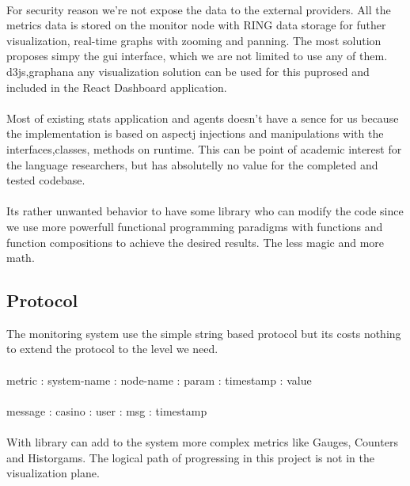 \paragraph{}
For security reason we're not expose the data to the external providers.
All the metrics data is stored on the monitor node with RING data storage for futher visualization, real-time graphs with zooming and panning.
The most solution proposes simpy the gui interface, which we are not limited to use any of them.
d3js,graphana any visualization solution can be used for this puprosed and included in the React Dashboard application.

\paragraph{}
Most of existing stats application and agents doesn't have a sence for us because the implementation is based on aspectj injections and manipulations with the interfaces,classes, methods on runtime.
This can be point of academic interest for the language researchers, but has absolutelly no value for the completed and tested codebase.

\paragraph{}
Its rather unwanted behavior to have some library who can modify the code since we use more powerfull functional programming paradigms with functions and function compositions to achieve the desired results. The less magic and more math.

\subsection*{Protocol}
The monitoring system use the simple string based protocol but its costs nothing to extend the protocol to the level we need.
\paragraph{}
metric : system-name : node-name : param : timestamp : value
\paragraph{}
message : casino : user : msg : timestamp

\paragraph{}
With  library can add to the system more complex metrics like Gauges, Counters and Historgams.
The logical path of progressing in this project is not in the visualization plane.

